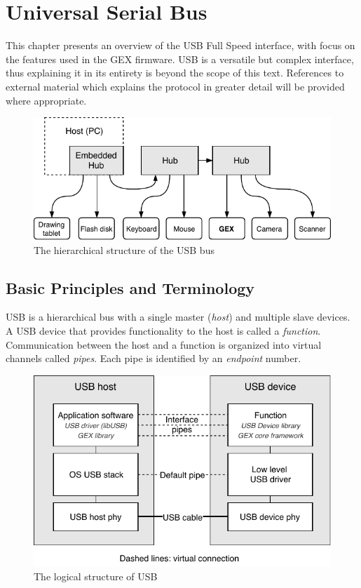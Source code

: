 \chapter{Universal Serial Bus}

This chapter presents an overview of the \gls{USB} Full Speed interface, with focus on the features used in the GEX firmware. \gls{USB} is a versatile but complex interface, thus explaining it in its entirety is beyond the scope of this text. References to external material which explains the protocol in greater detail will be provided where appropriate.

\begin{figure}[h]
	\centering
	\includegraphics[scale=1] {img/usb-hierarchy-redraw.pdf}
	\caption[USB hierarchical structure]{\label{fig:usb-hierarchy}The hierarchical structure of the USB bus}
\end{figure}

\section{Basic Principles and Terminology}


\gls{USB} is a hierarchical bus with a single master (\textit{host}) and multiple slave devices. A \gls{USB} device that provides functionality to the host is called a \textit{function}. Communication between the host and a function is organized into virtual channels called \textit{pipes}. Each pipe is identified by an \textit{endpoint} number.

\begin{figure}[h]
	\centering
	\includegraphics[scale=1] {img/usb-logical-redraw.pdf}
	\caption{\label{fig:usb-logical}The logical structure of USB}
\end{figure}

